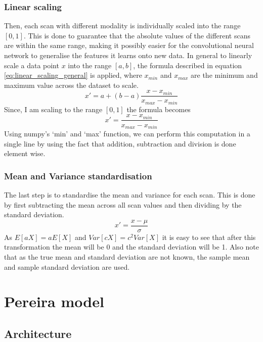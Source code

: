 \documentclass[12pt,a4paper,twoside,openright]{report}
\begin{document}
\subsubsection{Linear scaling}
Then, each scan with different modality is individually scaled into the range $[0,1]$. This is done to guarantee that the absolute values of the different scans are within the same range, making it possibly easier for the convolutional neural network to generalise the features it learns onto new data. In general to linearly scale a data point $x$ into the range $[a, b]$, the formula described in equation \ref{eq:linear_scaling_general} is applied, where $x_{min}$ and $x_{max}$ are the minimum and maximum value across the dataset to scale.
\begin{equation}
	\label{eq:linear_scaling_general}
	x' = a + (b - a)\frac{x - x_{min}}{x_{max} - x_{min}}
\end{equation}
Since, I am scaling to the range $[0,1]$ the formula becomes
\begin{equation}
	x' = \frac{x - x_{min}}{x_{max} - x_{min}}
\end{equation}
Using numpy's `min' and `max' function, we can perform this computation in a single line by using the fact that addition, subtraction and division is done element wise.

\subsubsection{Mean and Variance standardisation}
The last step is to standardise the mean and variance for each scan. This is done by first subtracting the mean across all scan values and then dividing by the standard deviation. 
\begin{equation}
	x' = \frac{x - \mu}{\sigma}
\end{equation}
As $E[aX] = a E[X]$ and $Var[cX] = c^2Var[X]$ it is easy to see that after this transformation the mean will be 0 and the standard deviation will be 1. Also note that as the true mean and standard deviation are not known, the sample mean and sample standard deviation are used. 

\section{Pereira model}

\subsection{Architecture}
\end{document}
